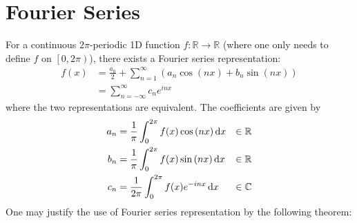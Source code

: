 \documentclass[../dissertation.tex]{subfiles}
\begin{document}
\section{Fourier Series}
For a continuous $2\pi$-periodic 1D function $f:\mathbb{R} \rightarrow \mathbb{R}$
(where one only needs to define $f$ on $\left[ 0,2\pi \right)$),
there exists a Fourier series representation:
\begin{align}
    f(x) &= \frac{a_0}{2} + \sum_{n=1}^{\infty} \left( a_n \cos {(nx)} + b_n \sin {(nx)} \right) \\
    &= \sum_{n=-\infty}^{\infty} c_n e^{inx}
\end{align}
where the two representations are equivalent.
The coefficients are given by
\begin{align}
    a_n &= \frac{1}{\pi} \int_{0}^{2\pi} f(x) \cos {\left( nx \right)} \, \text{d} x &\in \mathbb{R}\\
    b_n &= \frac{1}{\pi} \int_{0}^{2\pi} f(x) \sin {\left( nx \right)} \, \text{d} x &\in \mathbb{R} \\
    c_n &= \frac{1}{2 \pi} \int_{0}^{2\pi} f(x) e^{-inx} \, \text{d} x &\in \mathbb{C}
\end{align}
One may justify the use of Fourier series representation by the following theorem:
\begin{theorem}
\lipsum[1]
\end{theorem}
\end{document}
